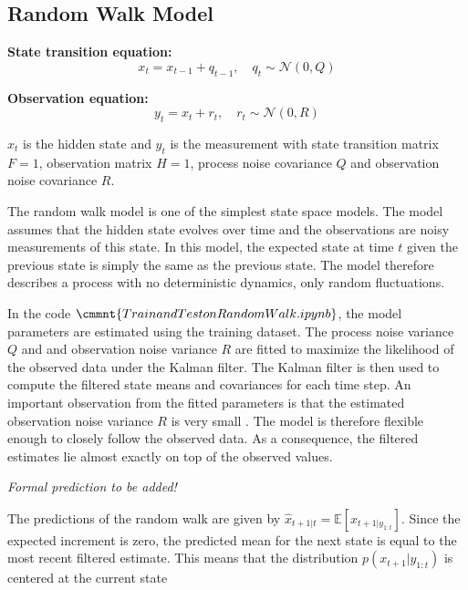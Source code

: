 \subsection*{Random Walk Model}

\noindent   
\textbf{State transition equation:}
\[x_t= x_{t-1} + q_{t-1}, \quad q_t \sim \mathcal{N}(0,Q)\]

\medskip
\noindent   
\textbf{Observation equation:}
$$y_t = x_t+ r_t, \quad r_t \sim \mathcal{N}(0,R)$$ 

$x_t$ is the hidden state and $y_t$ is the measurement with state transition matrix $F=1$, observation matrix $H=1$, process noise covariance $Q$ and observation noise covariance $R$.

The random walk model is one of the simplest state space models. The model assumes that the hidden state evolves over time and the observations are noisy measurements of this state. In this model, the expected state at time $t$ given the previous state is simply the same as the previous state. The model therefore describes a process with no deterministic dynamics, only random fluctuations. 

In the code $\cmmnt{Train and Test on RandomWalk.ipynb}$, the model parameters are estimated using the training dataset. The process noise variance $Q$ and and observation noise variance $R$ are fitted to maximize the likelihood of the observed data under the Kalman filter. The Kalman filter is then used to compute the filtered state means and covariances for each time step. 
An important observation from the fitted parameters is that the estimated observation noise variance $R$ is very small . The model is therefore flexible enough to closely follow the observed data. 
As a consequence, the filtered estimates lie almost exactly on top of the observed values. %


\medskip
\noindent
\textit{Formal prediction to be added!}

The predictions of the random walk are given by $\hat x_{t+1|t} = \mathbb{E}[x_{t+1|y_{1:t}}]$. Since the expected increment is zero, the predicted mean for the next state is equal to the most recent filtered estimate. This means that the distribution $p(x_{t+1}|y_{1:t})$ is centered at the current state

